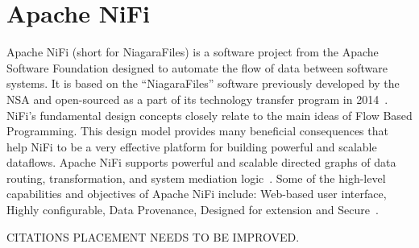 \section{Apache NiFi}
Apache NiFi (short for NiagaraFiles) is a software project from the Apache
Software Foundation designed to automate the flow of data between software
systems. It is based on the ``NiagaraFiles'' software previously developed by
the NSA and open-sourced as a part of its technology transfer program in 2014~\cite{nifi-wiki}.
 NiFi's fundamental design concepts closely relate to the main
ideas of Flow Based Programming. This design model provides many beneficial
consequences that help NiFi to be a very effective platform for building
powerful and scalable dataflows. Apache NiFi supports powerful and scalable
directed graphs of data routing, transformation, and system mediation
logic~\cite{nifi-overview}. Some of the high-level capabilities and objectives
of Apache NiFi include: Web-based user interface, Highly configurable, Data
Provenance, Designed for extension and Secure~\cite{nifi-web}. 
 
CITATIONS PLACEMENT NEEDS TO BE IMPROVED.

